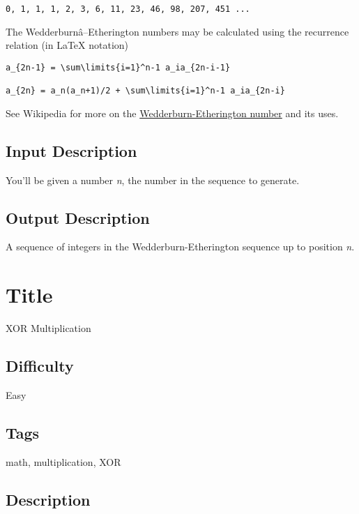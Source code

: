 \begin{verbatim}
0, 1, 1, 1, 2, 3, 6, 11, 23, 46, 98, 207, 451 ...
\end{verbatim}

The Wedderburnâ--Etherington numbers may be calculated using the
recurrence relation (in LaTeX notation)

\begin{verbatim}
a_{2n-1} = \sum\limits{i=1}^n-1 a_ia_{2n-i-1}

a_{2n} = a_n(a_n+1)/2 + \sum\limits{i=1}^n-1 a_ia_{2n-i}
\end{verbatim}

See Wikipedia for more on the
\href{http://en.wikipedia.org/wiki/Wedderburn\%E2\%80\%93Etherington_number}{Wedderburn-Etherington
number} and its uses.

\subsection{Input Description}\label{input-description-29}

You'll be given a number \emph{n}, the number in the sequence to
generate.

\subsection{Output Description}\label{output-description-30}

A sequence of integers in the Wedderburn-Etherington sequence up to
position \emph{n}.

\section{Title}\label{title-42}

XOR Multiplication

\subsection{Difficulty}\label{difficulty-41}

Easy

\subsection{Tags}\label{tags-42}

math, multiplication, XOR

\subsection{Description}\label{description-42}

